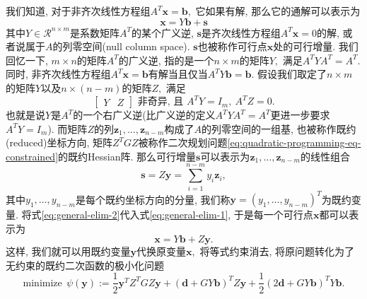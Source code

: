 \documentclass{SBCbookchapter}
\newcommand{\V}[1]{{\bm{#1}}}
\newcommand{\R}{\mathcal{R}}
\numberwithin{equation}{section}
\begin{document}
我们知道, 对于非齐次线性方程组$A^T \V{x} = \V{b},$ 它如果有解, 那么它的通解可以表示为
\begin{equation}
\label{eq:general-elim-1}
\V{x} = Y \V{b} + \V{s}
\end{equation}
其中$Y \in \R^{n\times m}$是系数矩阵$A^T$的某个广义逆, $\V{s}$是齐次线性方程组$A^T \V{x} = 0$的解, 或者说属于$A$的列零空间(null column space). $\V{s}$也被称作可行点$\V{x}$处的可行增量. 我们回忆一下, $m\times n$的矩阵$A^T$的广义逆, 指的是一个$n\times m$的矩阵$Y,$ 满足$A^T Y A^T = A^T.$ 同时, 非齐次线性方程组$A^T \V{x} = \V{b}$有解当且仅当$A^T Y \V{b} = \V{b}.$ 假设我们取定了$n \times m$的矩阵$Y$以及$n \times (n-m)$的矩阵$Z,$ 满足
\begin{equation}
\label{eq:eq:general-elim-req}
\begin{bmatrix} Y & Z\end{bmatrix} \text{ 非奇异, 且~} A^T Y = I_m, ~ A^T Z = 0.
\end{equation}
也就是说$Y$是$A^T$的一个右广义逆(比广义逆的定义$A^T Y A^T = A^T$更进一步要求$A^T Y = I_m$). 而矩阵$Z$的列$\V{z}_1, \ldots, \V{z}_{n-m}$构成了$A$的列零空间的一组基, 也被称作既约(reduced)坐标方向, 矩阵$Z^T G Z$被称作二次规划问题\eqref{eq:quadratic-programming-eq-constrained}的既约Hessian阵. 那么可行增量$\V{s}$可以表示为$\V{z}_1, \ldots, \V{z}_{n-m}$的线性组合
\begin{equation}
\label{eq:general-elim-2}
\V{s} = Z \V{y} = \sum\limits_{i=1}^{n-m} y_i \V{z}_i,
\end{equation}
其中$y_1, \ldots, y_{n-m}$是每个既约坐标方向的分量, 我们称$\V{y} = (y_1, \ldots, y_{n-m})^T$为既约变量. 将式\eqref{eq:general-elim-2}代入式\eqref{eq:general-elim-1}, 于是每一个可行点$\V{x}$都可以表示为
\begin{equation}
\label{eq:general-elim-3}
\V{x} = Y \V{b} + Z \V{y}.
\end{equation}
这样, 我们就可以用既约变量$\V{y}$代换原变量$\V{x},$ 将等式约束消去, 将原问题转化为了无约束的既约二次函数的极小化问题
\begin{equation}
\label{eq:general-elim-4}
\text{minimize} ~~ \psi(\V{y}) := \frac{1}{2} \V{y}^T Z^T G Z \V{y} + \left( \V{d} + G Y \V{b} \right)^T Z \V{y} + \frac{1}{2} \left( 2\V{d} + G Y \V{b} \right)^T Y \V{b}.
\end{equation}
\end{document}

